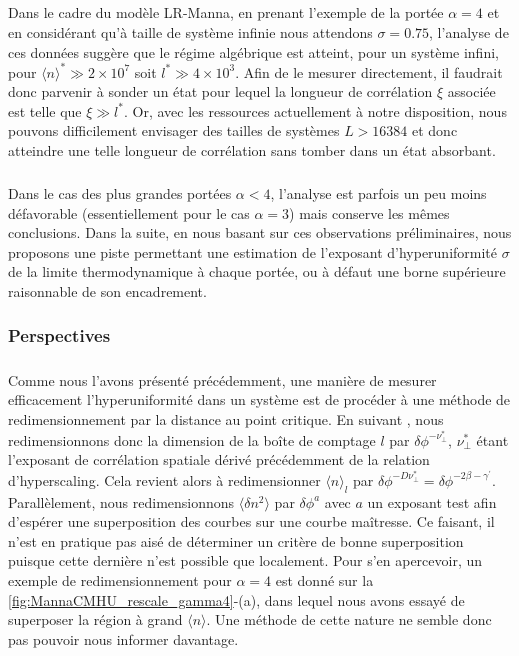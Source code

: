 \subparagraph{}Dans le cadre du modèle LR-Manna, en prenant l'exemple de la portée $\alpha=4$ et en considérant qu'à taille de système infinie nous attendons $\sigma=0.75$, l'analyse de ces données suggère que le régime algébrique est atteint, pour un système infini, pour $\langle n \rangle^* \gg 2\times 10^7$ soit $l^* \gg 4\times 10^3$. Afin de le mesurer directement, il faudrait donc parvenir à sonder un état pour lequel la longueur de corrélation $\xi$ associée est telle que $\xi\gg l^*$. Or, avec les ressources actuellement à notre disposition, nous pouvons difficilement envisager des tailles de systèmes $L>16384$ et donc atteindre une telle longueur de corrélation sans tomber dans un état absorbant. 

\subparagraph{}Dans le cas des plus grandes portées $\alpha<4$, l'analyse est parfois un peu moins défavorable (essentiellement pour le cas $\alpha = 3$) mais conserve les mêmes conclusions. Dans la suite, en nous basant sur ces observations préliminaires, nous proposons une piste permettant une estimation de l'exposant d'hyperuniformité $\sigma$ de la limite thermodynamique à chaque portée, ou à défaut une borne supérieure raisonnable de son encadrement.

\subsubsection{Perspectives}

\subparagraph{}Comme nous l'avons présenté précédemment, une manière de mesurer efficacement l'hyperuniformité dans un système est de procéder à une méthode de redimensionnement par la distance au point critique. En suivant \cite{hexner_hyperuniformity_2015}, nous redimensionnons donc la dimension de la boîte de comptage $l$ par $\delta\phi^{-\nu_\perp^*}$, $\nu_\perp^*$ étant l'exposant de corrélation spatiale dérivé précédemment de la relation d'hyperscaling. Cela revient alors à redimensionner $\langle n \rangle_l$ par $\delta\phi^{-D \nu_\perp^*} = \delta\phi^{-2\beta-\gamma^\prime}$. Parallèlement, nous redimensionnons $\langle \delta n^2 \rangle$ par $\delta\phi^a$ avec $a$ un exposant test afin d'espérer une superposition des courbes sur une courbe maîtresse. Ce faisant, il n'est en pratique pas aisé de déterminer un critère de bonne superposition puisque cette dernière n'est possible que localement. Pour s'en apercevoir, un exemple de redimensionnement pour $\alpha=4$ est donné sur la \autoref{fig:MannaCMHU_rescale_gamma4}-(a), dans lequel nous avons essayé de superposer la région à grand $\langle n \rangle$. Une méthode de cette nature ne semble donc pas pouvoir nous informer davantage.

